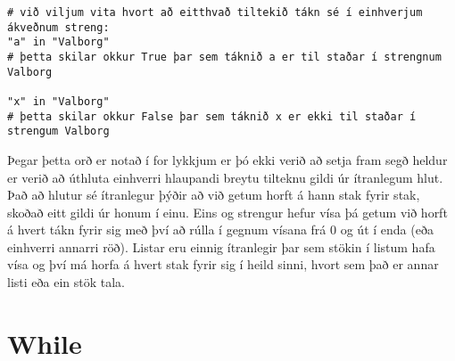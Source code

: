 \begin{lstlisting}[caption=Lykilorðið in, label=lst:lykkjur-in]
# við viljum vita hvort að eitthvað tiltekið tákn sé í einhverjum ákveðnum streng:
"a" in "Valborg"
# þetta skilar okkur True þar sem táknið a er til staðar í strengnum Valborg

"x" in "Valborg"
# þetta skilar okkur False þar sem táknið x er ekki til staðar í strengum Valborg
\end{lstlisting}

Þegar þetta orð er notað í for lykkjum er þó ekki verið að setja fram segð heldur er verið að úthluta einhverri hlaupandi breytu tilteknu gildi úr ítranlegum hlut.
Það að hlutur sé ítranlegur þýðir að við getum horft á hann stak fyrir stak, skoðað eitt gildi úr honum í einu.
Eins og strengur hefur vísa þá getum við horft á hvert tákn fyrir sig með því að rúlla í gegnum vísana frá 0 og út í enda (eða einhverri annarri röð).
Listar eru einnig ítranlegir þar sem stökin í listum hafa vísa og því má horfa á hvert stak fyrir sig í heild sinni, hvort sem það er annar listi eða ein stök tala.


\section{While}